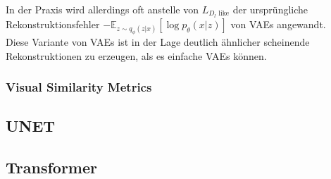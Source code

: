 In der Praxis wird allerdings oft anstelle von $L_{D_l\text{ like}}$ der ursprüngliche Rekonstruktionsfehler $- \mathbb E_{z \sim q_{\phi}(z|x)}
    \left [
        \log p_\theta(x|z)
    \right ]$ von VAEs angewandt. \\
Diese Variante von VAEs ist in der Lage deutlich ähnlicher scheinende Rekonstruktionen zu erzeugen, als es einfache VAEs können.


\subsubsection{Visual Similarity Metrics}




\subsection{UNET}

\subsection{Transformer}

